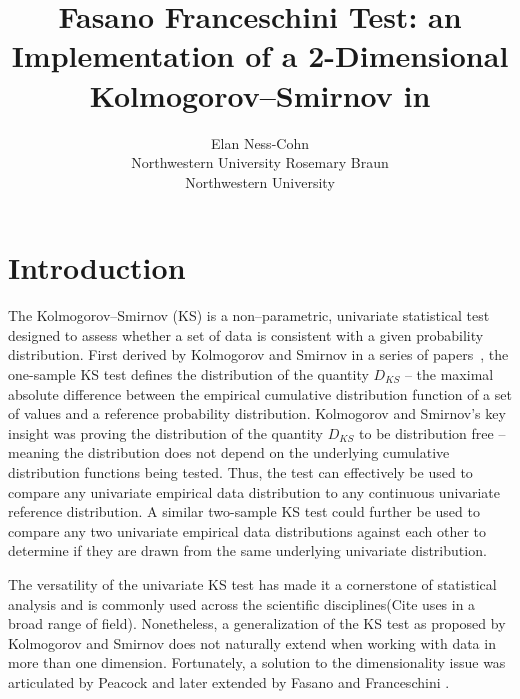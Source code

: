 \documentclass[codesnippet]{jss}
\author{Elan Ness-Cohn\\Northwestern University
   \And Rosemary Braun\\Northwestern University}
\title{Fasano Franceschini Test: an Implementation of a 2-Dimensional Kolmogorov--Smirnov in \proglang{R}}
\begin{document}


\section[Introduction]{Introduction} \label{sec:intro}


The Kolmogorov--Smirnov (KS) is a non--parametric, univariate statistical test designed to assess whether a set of data is consistent with a given probability distribution. First derived by Kolmogorov and Smirnov in a series of papers~\citep{Kolmogorov1933,Kolmogorov1933a,Smirnov1936,Smirnov1937,Smirnov1939,Smirnov1944,Smirnov1948}, the one-sample KS test defines the distribution of the quantity $D_{KS}$ -- the maximal absolute difference between the empirical cumulative distribution function of a set of values and a reference probability distribution. Kolmogorov and Smirnov's key insight was proving the distribution of the quantity $D_{KS}$ to be distribution free -- meaning the distribution does not depend on the underlying cumulative distribution functions being tested. Thus, the test can effectively be used to compare any univariate empirical data distribution to any continuous univariate reference distribution. A similar two-sample KS test could further be used to compare any two univariate empirical data distributions against each other to determine if they are drawn from the same underlying univariate distribution.

The versatility of the univariate KS test has made it a cornerstone of statistical analysis and is commonly used across the scientific disciplines(Cite uses in a broad range of field). Nonetheless, a generalization of the KS test as proposed by Kolmogorov and Smirnov does not naturally extend when working with data in more than one dimension. Fortunately, a solution to the dimensionality issue was articulated by Peacock \citep{Peacock1983} and later extended by Fasano and Franceschini \citep{Fasano1987}.
\end{document}
